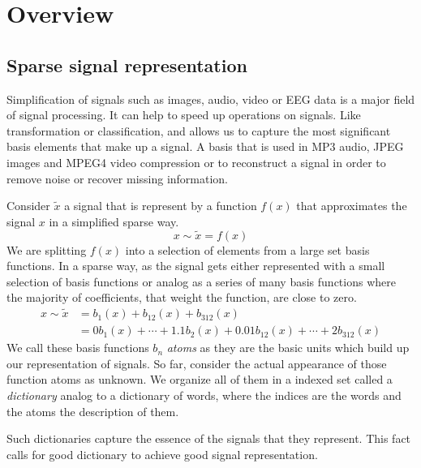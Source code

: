 \chapter{Overview}

\section{Sparse signal representation}
\label{sec:dicts}
Simplification of signals such as images, audio, video or EEG data is a major
field of signal processing. It can help to speed up operations on signals. Like
transformation or classification, and allows us to capture the most
significant basis elements that make up a signal. A basis that is
used in MP3 audio, JPEG images and MPEG4 video compression or to reconstruct
a signal in order to remove noise or recover missing information.

Consider $\tilde{x}$ a signal that is represent by a function $f(x)$ that
approximates
the signal $x$ in a simplified sparse way.
\begin{equation*}
x \sim \tilde{x} = f\left(x\right)
\end{equation*}
We are splitting $f(x)$ into a selection of elements from a large set
basis functions. In a sparse way, as the signal gets either represented with
a small selection of basis functions or analog as a series of many basis
functions where the majority of coefficients, that weight the function, are
close to zero. 
\begin{equation*}
\begin{split}
x \sim \tilde{x} & = b_{1}(x) + b_{12}(x) + b_{312}(x)\\
& = 0b_{1}(x) + \cdots + 1.1b_{2}(x) + 0.01b_{12}(x) + \cdots +
2b_{312}(x)
\end{split}
\end{equation*}
We call these basis functions $b_n$ \emph{atoms} as they are the basic units
which build up our representation of signals. So far, consider the actual
appearance of those function atoms as unknown. We organize all of them in a
indexed set called a \emph{dictionary} analog to a dictionary of words, where
the indices are the words and the atoms the description of them. 

Such dictionaries capture the essence of the signals that they represent.
This fact calls for good dictionary to achieve good signal representation.

